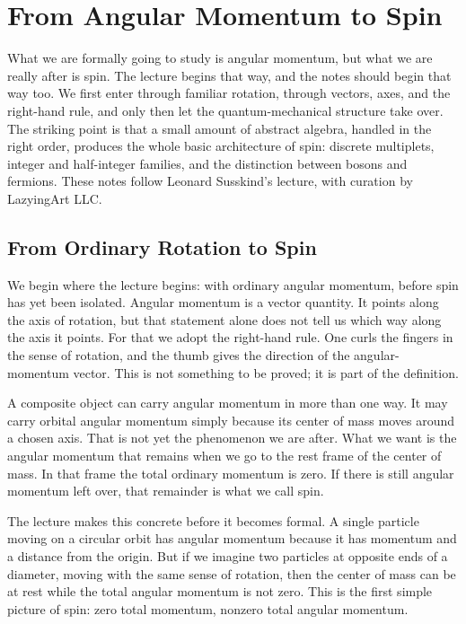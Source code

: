 \chapter{From Angular Momentum to Spin}

What we are formally going to study is angular momentum, but what we are really after is spin. The lecture begins that way, and the notes should begin that way too. We first enter through familiar rotation, through vectors, axes, and the right-hand rule, and only then let the quantum-mechanical structure take over. The striking point is that a small amount of abstract algebra, handled in the right order, produces the whole basic architecture of spin: discrete multiplets, integer and half-integer families, and the distinction between bosons and fermions. These notes follow Leonard Susskind's lecture, with curation by LazyingArt LLC.

\section{From Ordinary Rotation to Spin}

We begin where the lecture begins: with ordinary angular momentum, before spin has yet been isolated. Angular momentum is a vector quantity. It points along the axis of rotation, but that statement alone does not tell us which way along the axis it points. For that we adopt the right-hand rule. One curls the fingers in the sense of rotation, and the thumb gives the direction of the angular-momentum vector. This is not something to be proved; it is part of the definition.

A composite object can carry angular momentum in more than one way. It may carry orbital angular momentum simply because its center of mass moves around a chosen axis. That is not yet the phenomenon we are after. What we want is the angular momentum that remains when we go to the rest frame of the center of mass. In that frame the total ordinary momentum is zero. If there is still angular momentum left over, that remainder is what we call spin.

The lecture makes this concrete before it becomes formal. A single particle moving on a circular orbit has angular momentum because it has momentum and a distance from the origin. But if we imagine two particles at opposite ends of a diameter, moving with the same sense of rotation, then the center of mass can be at rest while the total angular momentum is not zero. This is the first simple picture of spin: zero total momentum, nonzero total angular momentum.

